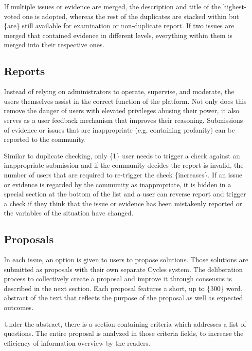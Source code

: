 \documentclass[a4paper,11pt]{article}
\begin{document}
\begin{multicols}{2}
If multiple issues or evidence are merged, the description and title of the highest-voted one is adopted, whereas the rest of the duplicates are stacked within but \{are\} still available for examination or non-duplicate report. If two issues are merged that contained evidence in different levels, everything within them is merged into their respective ones.

\subsection{Reports} \label{reports}

Instead of relying on administrators to operate, supervise, and moderate, the users themselves assist in the correct function of the platform. Not only does this remove the danger of users with elevated privileges abusing their power, it also serves as a user feedback mechanism that improves their reasoning. Submissions of evidence or issues that are inappropriate (e.g. containing profanity) can be reported to the community.

Similar to duplicate checking, only \{1\} user needs to trigger a check against an inappropriate submission and if the community decides the report is invalid, the number of users that are required to re-trigger the check \{increases\}. If an issue or evidence is regarded by the community as inappropriate, it is hidden in a special section at the bottom of the list and a user can reverse report and trigger a check if they think that the issue or evidence has been mistakenly reported or the variables of the situation have changed.

\subsection{Proposals} \label{proposals}

In each issue, an option is given to users to propose solutions. Those solutions are submitted as proposals with their own separate Cycles system. The deliberation process to collectively create a proposal and improve it through consensus is described in the next section. Each proposal features a short, up to \{300\} word, abstract of the text that reflects the purpose of the proposal as well as expected outcomes.

Under the abstract, there is a section containing criteria which addresses a list of questions. The entire proposal is analyzed in those criteria fields, to increase the efficiency of information overview by the readers.


\end{multicols}
\end{document}
